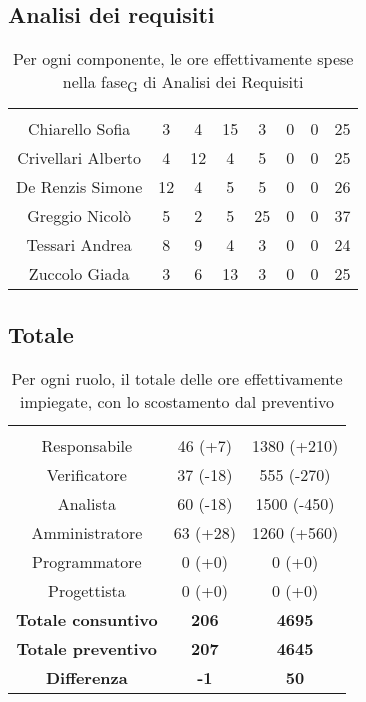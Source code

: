 \subsection{Analisi dei requisiti}

\begin{table}[H]
	\begin{center}
		\begin{tabular}{c
				!{\color[HTML]{9b240a}\vrule width 1pt}
				cccccc
				!{\color[HTML]{9b240a}\vrule width 1pt}	
				c}
			\rowcolorhead
			 &  &  &  &  &  &  &  \\
			
			Chiarello Sofia & 3 & 4 & 15 & 3 & 0 & 0 & 25\\
			Crivellari Alberto & 4 & 12 & 4 & 5 & 0 & 0 & 25\\
			De Renzis Simone & 12 & 4 & 5 & 5 & 0 & 0 & 26\\
			Greggio Nicolò & 5 & 2 & 5 & 25 & 0 & 0 & 37\\
			Tessari Andrea & 8 & 9 & 4 & 3 & 0 & 0 & 24\\
			Zuccolo Giada & 3 & 6 & 13 & 3 & 0 & 0 & 25\\
		\end{tabular}
		\caption[Consuntivo \gls{fase}\textsubscript{G} di Analisi dei Requisiti]{Per ogni componente, le ore effettivamente spese nella \gls{fase}\textsubscript{G} di Analisi dei Requisiti}
	\end{center}
\end{table}



\subsection{Totale}

\begin{table}[H]
	\centering
	\begin{tabular}{ccc}
		\rowcolorhead
		\headertitle{Ruolo} & \headertitle{Ore} & \headertitle{Costo(\euro{})}\\
		Responsabile & 46 (+7) & 1380 (+210) \\
		Verificatore & 37 (-18) & 555 (-270)\\
		Analista & 60 (-18) & 1500 (-450)\\				
		Amministratore & 63 (+28) & 1260 (+560)\\
		Programmatore & 0 (+0) & 0 (+0)\\
		Progettista & 0 (+0) & 0 (+0)\\
		\hline		
		\textbf{Totale consuntivo} & \textbf{206} & \textbf{4695}\\
		\textbf{Totale preventivo} & \textbf{207} & \textbf{4645}\\
		\textbf{Differenza} & \textbf{-1} & \textbf{50}\\
	\end{tabular}
	\caption[Confronto tra preventivo e consuntivo]{Per ogni ruolo, il totale delle ore effettivamente impiegate, con lo scostamento dal preventivo}
\end{table}


